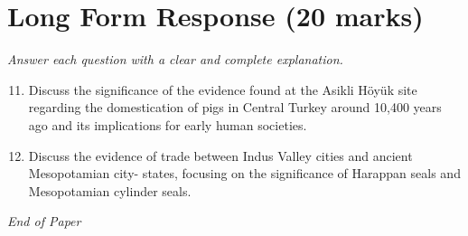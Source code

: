 \documentclass[12pt]{article}
\begin{document}
\section*{Long Form Response (20 marks)}
\textit{Answer each question with a clear and complete explanation.}
\begin{enumerate}[label=\arabic*.]
\setcounter{enumi}{10}
\item Discuss the significance of the evidence found at the Asikli Höyük site regarding the
domestication of pigs in Central Turkey around 10,400 years ago and its implications for
early human societies.
\item Discuss the evidence of trade between Indus Valley cities and ancient Mesopotamian city-
states, focusing on the significance of Harappan seals and Mesopotamian cylinder seals.
\end{enumerate}

\vfill
\noindent\textit{End of Paper}
\end{document}

